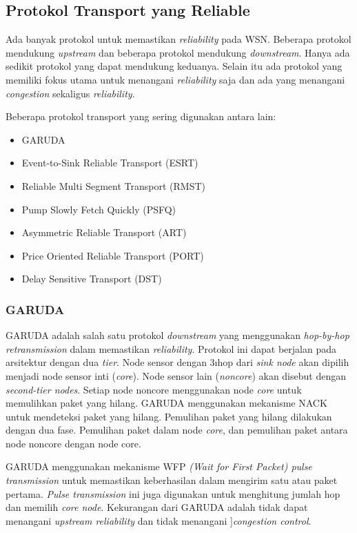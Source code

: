 \subsection{Protokol Transport yang Reliable \cite{Prakasm_2014}}
Ada banyak protokol untuk memastikan \textit{reliability} pada WSN. Beberapa protokol mendukung \textit{upstream} dan beberapa protokol mendukung \textit{downstream}. Hanya ada sedikit protokol yang dapat mendukung keduanya. Selain itu ada protokol yang memiliki fokus utama untuk menangani \textit{reliability} saja dan ada yang menangani \textit{congestion} sekaligus \textit{reliability}. 

Beberapa protokol transport yang sering digunakan antara lain:
\begin{itemize}
	\item GARUDA
	\item Event-to-Sink Reliable Transport (ESRT)
	\item Reliable Multi Segment Transport (RMST)
	\item Pump Slowly Fetch Quickly (PSFQ)
	\item Asymmetric Reliable Transport (ART)
	\item Price Oriented Reliable Transport (PORT)
	\item Delay Sensitive Transport (DST)
\end{itemize}

\subsubsection{GARUDA}
GARUDA adalah salah satu protokol \textit{downstream} yang menggunakan \textit{hop-by-hop retransmission} dalam memastikan \textit{reliability}. Protokol ini dapat berjalan pada arsitektur dengan dua \textit{tier}. Node sensor dengan 3\i hop dari \textit{sink node} akan dipilih menjadi node sensor inti (\textit{core}). Node sensor lain (\textit{noncore}) akan disebut dengan \textit{second-tier nodes}. Setiap node noncore menggunakan node \textit{core} untuk memulihkan paket yang hilang.  GARUDA menggunakan mekanisme NACK untuk mendeteksi paket yang hilang. Pemulihan paket yang hilang dilakukan dengan dua fase. Pemulihan paket dalam node \textit{core}, dan pemulihan paket antara node noncore dengan node core. 

GARUDA menggunakan mekanisme WFP \textit{(Wait for First Packet) pulse transmission} untuk memastikan keberhasilan dalam mengirim satu atau paket pertama. \textit{Pulse transmission} ini juga digunakan untuk menghitung jumlah hop dan memilih \textit{core node}. Kekurangan dari GARUDA adalah tidak dapat menangani \textit{upstream reliability} dan tidak menangani ]\textit{congestion control}.  


